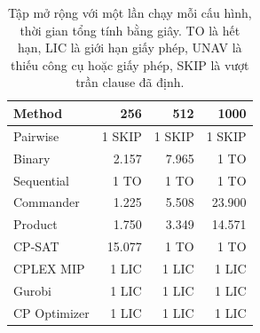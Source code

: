 \begin{table}[htbp]
\centering\small
\caption{Tập mở rộng với một lần chạy mỗi cấu hình, thời gian tổng tính bằng giây. TO là hết hạn, LIC là giới hạn giấy phép, UNAV là thiếu công cụ hoặc giấy phép, SKIP là vượt trần clause đã định.}
\label{tab:large}
\begin{tabular}{lrrr}
\toprule
Method & 256 & 512 & 1000 \\
\midrule
Pairwise & 1 SKIP & 1 SKIP & 1 SKIP \\
Binary & 2.157 & 7.965 & 1 TO \\
Sequential & 1 TO & 1 TO & 1 TO \\
Commander & 1.225 & 5.508 & 23.900 \\
Product & 1.750 & 3.349 & 14.571 \\
CP-SAT & 15.077 & 1 TO & 1 TO \\
CPLEX MIP & 1 LIC & 1 LIC & 1 LIC \\
Gurobi & 1 LIC & 1 LIC & 1 LIC \\
CP Optimizer & 1 LIC & 1 LIC & 1 LIC \\
\bottomrule
\end{tabular}
\end{table}
